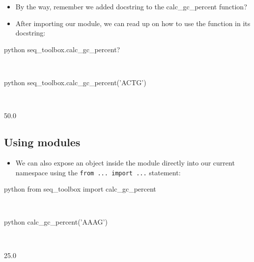 \documentclass[aspectratio=1610,slidestop]{beamer}
\begin{document}
\begin{pframe}
 \begin{itemize}
  \item By the way, remember we added docstring to the calc\_gc\_percent
  function?
  \item After importing our module, we can read up on how to use the function
  in its docstring:
 \end{itemize}
 \vspace{-0.3cm}
 \begin{ipython}
   \begin{pythonin}{python}
seq_toolbox.calc_gc_percent?
   \end{pythonin}
   \\
   \begin{pythonin}{python}
seq_toolbox.calc_gc_percent('ACTG')
   \end{pythonin}
   \\
   \begin{pythonout}
50.0
   \end{pythonout}
 \end{ipython}
\end{pframe}

\subsection{Using modules}
\begin{pframe}
 \begin{itemize}
  \item We can also expose an object inside the module directly into our
  current namespace using the \texttt{from ... import ...}
  statement:
 \end{itemize}
 \begin{ipython}
   \begin{pythonin}{python}
from seq_toolbox import calc_gc_percent
   \end{pythonin}
   \\
   \begin{pythonin}{python}
calc_gc_percent('AAAG')
   \end{pythonin}
   \\
   \begin{pythonout}
25.0
   \end{pythonout}
 \end{ipython}
\end{pframe}
\end{document}
